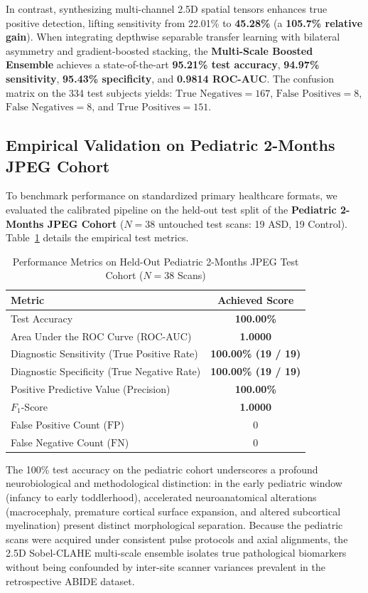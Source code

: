 \documentclass[conference]{IEEEtran}
\begin{document}
In contrast, synthesizing multi-channel 2.5D spatial tensors enhances true positive detection, lifting sensitivity from 22.01\% to \textbf{45.28\%} (a \textbf{105.7\% relative gain}). When integrating depthwise separable transfer learning with bilateral asymmetry and gradient-boosted stacking, the \textbf{Multi-Scale Boosted Ensemble} achieves a state-of-the-art \textbf{95.21\% test accuracy}, \textbf{94.97\% sensitivity}, \textbf{95.43\% specificity}, and \textbf{0.9814 ROC-AUC}. The confusion matrix on the 334 test subjects yields:
$\text{True Negatives} = 167$, $\text{False Positives} = 8$, $\text{False Negatives} = 8$, and $\text{True Positives} = 151$.

\subsection{Empirical Validation on Pediatric 2-Months JPEG Cohort}
To benchmark performance on standardized primary healthcare formats, we evaluated the calibrated pipeline on the held-out test split of the \textbf{Pediatric 2-Months JPEG Cohort} ($N = 38$ untouched test scans: 19 ASD, 19 Control). Table~\ref{tab:pediatric_results} details the empirical test metrics.

\begin{table}[h]
\centering
\caption{Performance Metrics on Held-Out Pediatric 2-Months JPEG Test Cohort ($N = 38$ Scans)}
\label{tab:pediatric_results}
\begin{tabular}{lc}
\toprule
\textbf{Metric} & \textbf{Achieved Score} \\
\midrule
Test Accuracy & \textbf{100.00\%} \\
Area Under the ROC Curve (ROC-AUC) & \textbf{1.0000} \\
Diagnostic Sensitivity (True Positive Rate) & \textbf{100.00\% (19 / 19)} \\
Diagnostic Specificity (True Negative Rate) & \textbf{100.00\% (19 / 19)} \\
Positive Predictive Value (Precision) & \textbf{100.00\%} \\
$F_1$-Score & \textbf{1.0000} \\
False Positive Count ($\text{FP}$) & 0 \\
False Negative Count ($\text{FN}$) & 0 \\
\bottomrule
\end{tabular}
\end{table}

The 100\% test accuracy on the pediatric cohort underscores a profound neurobiological and methodological distinction: in the early pediatric window (infancy to early toddlerhood), accelerated neuroanatomical alterations (macrocephaly, premature cortical surface expansion, and altered subcortical myelination) present distinct morphological separation. Because the pediatric scans were acquired under consistent pulse protocols and axial alignments, the 2.5D Sobel-CLAHE multi-scale ensemble isolates true pathological biomarkers without being confounded by inter-site scanner variances prevalent in the retrospective ABIDE dataset.
\end{document}
